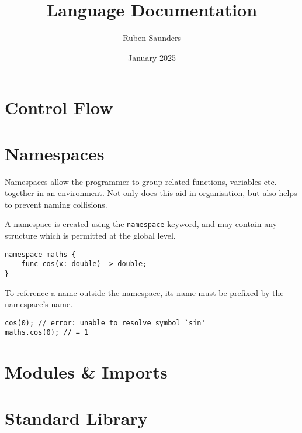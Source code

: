 \documentclass{article}
\title{Language Documentation}
\author{Ruben Saunders}
\date{January 2025}
\begin{document}
    \maketitle
    \tableofcontents

    \newpage

    

    

    

    

    

    

    \section{Control Flow}

    \section{Namespaces}

    Namespaces allow the programmer to group related functions, variables etc. together in an environment.
    Not only does this aid in organisation, but also helps to prevent naming collisions.

    A namespace is created using the \texttt{namespace} keyword, and may contain any structure which is permitted at the global level.

    \begin{lstlisting}[language=CustomLang]
namespace maths {
    func cos(x: double) -> double;
}
    \end{lstlisting}

    To reference a name outside the namespace, its name must be prefixed by the namespace's name.

    \begin{lstlisting}[language=CustomLang]
cos(0); // error: unable to resolve symbol `sin'
maths.cos(0); // = 1
    \end{lstlisting}

    \section{Modules \& Imports}

    \section{Standard Library}
\end{document}
